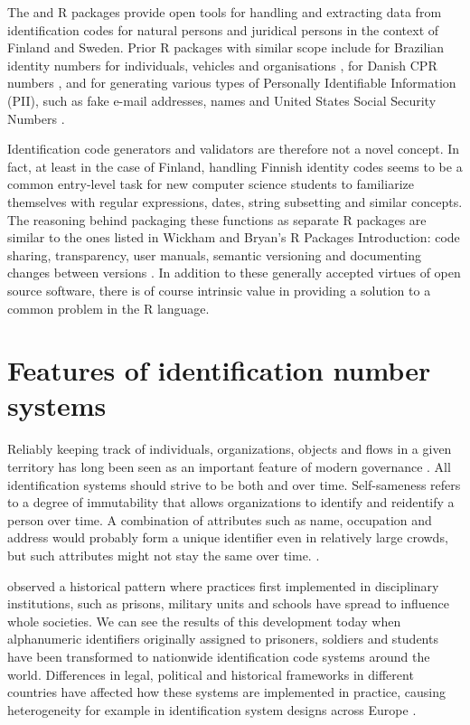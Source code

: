 The  and  R packages provide open tools for handling and extracting data from identification codes for natural persons and juridical persons in the context of Finland and Sweden. Prior R packages with similar scope include  for Brazilian identity numbers for individuals, vehicles and organisations \citep{numbersbr},  for Danish CPR numbers \citep{cprr}, and  for generating various types of Personally Identifiable Information (PII), such as fake e-mail addresses, names and United States Social Security Numbers \citep{generator}.

Identification code generators and validators are therefore not a novel concept. In fact, at least in the case of Finland, handling Finnish identity codes seems to be a common entry-level task for new computer science students to familiarize themselves with regular expressions, dates, string subsetting and similar concepts. The reasoning behind packaging these functions as separate R packages are similar to the ones listed in Wickham and Bryan's R Packages Introduction: code sharing, transparency, user manuals, semantic versioning and documenting changes between versions \citep{wickham2022}. In addition to these generally accepted virtues of open source software, there is of course intrinsic value in providing a solution to a common problem in the R language.

\section{Features of identification number systems}

Reliably keeping track of individuals, organizations, objects and flows in a given territory has long been seen as an important feature of modern governance \citep{dodge2005}. All identification systems should strive to be both  and  over time. Self-sameness refers to a degree of immutability that allows organizations to identify and reidentify a person over time. A combination of attributes such as name, occupation and address would probably form a unique identifier even in relatively large crowds, but such attributes might not stay the same over time. \citep{brensinger2021}.

\citet[115-120]{foucault7778} observed a historical pattern where practices first implemented in disciplinary institutions, such as prisons, military units and schools have spread to influence whole societies. We can see the results of this development today when alphanumeric identifiers originally assigned to prisoners, soldiers and students have been transformed to nationwide identification code systems around the world. Differences in legal, political and historical frameworks in different countries have affected how these systems are implemented in practice, causing heterogeneity for example in identification system designs across Europe \citep{otjacques2007}. 

